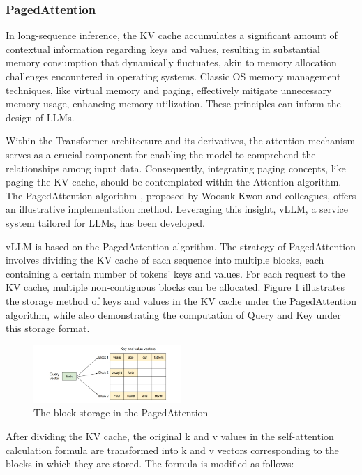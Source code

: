 \documentclass[conference]{IEEEtran}
\begin{document}
\subsubsection{PagedAttention}
In long-sequence inference, the KV cache accumulates a significant amount of contextual information regarding keys and values, resulting in substantial memory consumption that dynamically fluctuates, akin to memory allocation challenges encountered in operating systems. Classic OS memory management techniques, like virtual memory and paging, effectively mitigate unnecessary memory usage, enhancing memory utilization. These principles can inform the design of LLMs.

Within the Transformer architecture and its derivatives, the attention mechanism serves as a crucial component for enabling the model to comprehend the relationships among input data. Consequently, integrating paging concepts, like paging the KV cache, should be contemplated within the Attention algorithm. The PagedAttention algorithm \cite{b1}, proposed by Woosuk Kwon and colleagues, offers an illustrative implementation method. Leveraging this insight, vLLM, a service system tailored for LLMs, has been developed.

vLLM is based on the PagedAttention algorithm. The strategy of PagedAttention involves dividing the KV cache of each sequence into multiple blocks, each containing a certain number of tokens' keys and values. For each request to the KV cache, multiple non-contiguous blocks can be allocated. Figure 1 illustrates the storage method of keys and values in the KV cache under the PagedAttention algorithm, while also demonstrating the computation of Query and Key under this storage format.

\begin{figure}[htbp]
    \centerline{\includegraphics[width=0.5\textwidth]{process figM1.png}}
    \caption{The block storage in the PagedAttention \cite{b1}}
    \label{fig}
\end{figure}

After dividing the KV cache, the original k and v values in the self-attention calculation formula are transformed into k and v vectors corresponding to the blocks in which they are stored. The formula is modified as follows:
\end{document}
